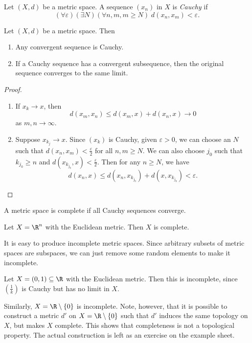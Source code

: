 \documentclass[a4paper]{article}
\begin{document}
\begin{defi}
  Let $(X, d)$ be a metric space. A sequence $(x_n)$ in $X$ is \emph{Cauchy} if
  \[
    (\forall \varepsilon)(\exists N)(\forall n, m, m \geq N)\; d(x_n, x_m) < \varepsilon.
  \]
\end{defi}

\begin{prop}
  Let $(X, d)$ be a metric space. Then
  \begin{enumerate}
    \item Any convergent sequence is Cauchy.
    \item If a Cauchy sequence has a convergent subsequence, then the original sequence converges to the same limit.
  \end{enumerate}
\end{prop}

\begin{proof}\leavevmode
  \begin{enumerate}
    \item If $x_k \to x$, then
      \[
        d(x_m, x_n) \leq d(x_m, x) + d(x_n, x) \to 0
      \]
      as $m, n \to \infty$.
    \item Suppose $x_{k_j} \to x$. Since $(x_k)$ is Cauchy, given $\varepsilon > 0$, we can choose an $N$ such that $d(x_n, x_m) < \frac{\varepsilon}{2}$ for all $n, m \geq N$. We can also choose $j_0$ such that $k_{j_0} \geq n$ and $d(x_{k_{j_0}}, x) < \frac{\varepsilon}{2}$. Then for any $n \geq N$, we have
      \[
        d(x_n, x) \leq d(x_n, x_{k_{j_0}}) + d(x, x_{k_{j_0}}) < \varepsilon.
      \]
  \end{enumerate}
\end{proof}

\begin{defi}
  A metric space is complete if all Cauchy sequences converge.
\end{defi}

\begin{eg}
  Let $X = \R^n$ with the Euclidean metric. Then $X$ is complete.
\end{eg}
It is easy to produce incomplete metric spaces. Since arbitrary subsets of metric spaces are subspaces, we can just remove some random elements to make it incomplete.

\begin{eg}
  Let $X = (0, 1) \subseteq \R$ with the Euclidean metric. Then this is incomplete, since $\left(\frac{1}{k}\right)$ is Cauchy but has no limit in $X$.

  Similarly, $X = \R \setminus \{0\}$ is incomplete. Note, however, that it is possible to construct a metric $d'$ on $X = \R \setminus \{0\}$ such that $d'$ induces the same topology on $X$, but makes $X$ complete. This shows that completeness is not a topological property. The actual construction is left as an exercise on the example sheet.
\end{eg}
\end{document}
